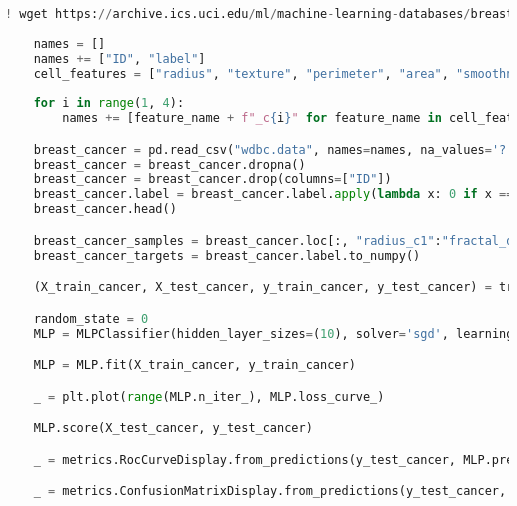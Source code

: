 \begin{lstlisting}[language=Python, caption=Programma Completo]
    ! wget https://archive.ics.uci.edu/ml/machine-learning-databases/breast-cancer-wisconsin/wdbc.data
    
    names = []
    names += ["ID", "label"]
    cell_features = ["radius", "texture", "perimeter", "area", "smoothness", "compactness", "concavity", "concave_points", "symmetry", "fractal_dimension",]
    
    for i in range(1, 4):
        names += [feature_name + f"_c{i}" for feature_name in cell_features]

    breast_cancer = pd.read_csv("wdbc.data", names=names, na_values='?')
    breast_cancer = breast_cancer.dropna()
    breast_cancer = breast_cancer.drop(columns=["ID"])
    breast_cancer.label = breast_cancer.label.apply(lambda x: 0 if x == "B" else 1)
    breast_cancer.head()

    breast_cancer_samples = breast_cancer.loc[:, "radius_c1":"fractal_dimension_c3"].to_numpy()
    breast_cancer_targets = breast_cancer.label.to_numpy()

    (X_train_cancer, X_test_cancer, y_train_cancer, y_test_cancer) = train_test_split(breast_cancer_samples, breast_cancer_targets)

    random_state = 0
    MLP = MLPClassifier(hidden_layer_sizes=(10), solver='sgd', learning_rate_init=0.0001, max_iter=1000, random_state=random_state)

    MLP = MLP.fit(X_train_cancer, y_train_cancer)

    _ = plt.plot(range(MLP.n_iter_), MLP.loss_curve_)

    MLP.score(X_test_cancer, y_test_cancer)

    _ = metrics.RocCurveDisplay.from_predictions(y_test_cancer, MLP.predict_proba(X_test_cancer)[:, 1])

    _ = metrics.ConfusionMatrixDisplay.from_predictions(y_test_cancer, MLP.predict(X_test_cancer))
\end{lstlisting}